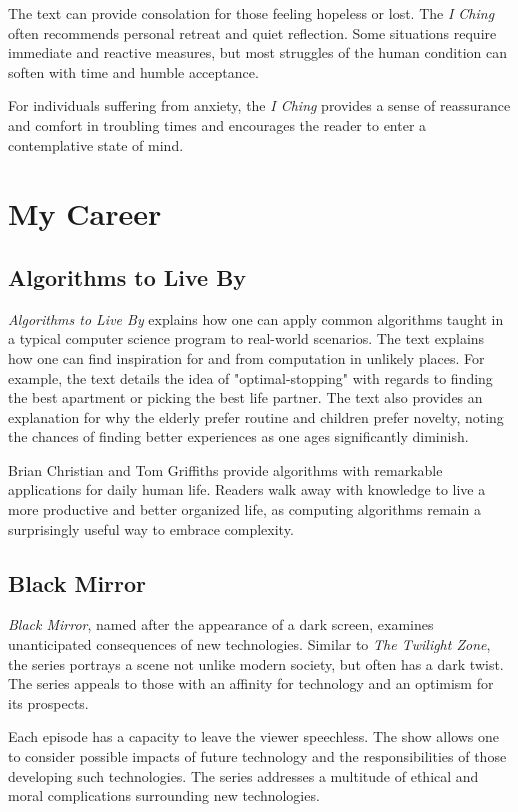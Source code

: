 \documentclass{article}
\begin{document}
The text can provide consolation for those feeling hopeless or lost. The \textit{I Ching} often recommends personal retreat and quiet reflection. Some situations require immediate and reactive measures, but most struggles of the human condition can soften with time and humble acceptance. 

For individuals suffering from anxiety, the \textit{I Ching} provides a sense of reassurance and comfort in troubling times and encourages the reader to enter a contemplative state of mind. 

\section{My Career}

\subsection{Algorithms to Live By}
\textit{Algorithms to Live By} explains how one can apply common algorithms taught in a typical computer science program to real-world scenarios. The text explains how one can find inspiration for and from computation in unlikely places. For example, the text details the idea of "optimal-stopping" with regards to finding the best apartment or picking the best life partner. The text also provides an explanation for why the elderly prefer routine and children prefer novelty, noting the chances of finding better experiences as one ages significantly diminish. 

Brian Christian and Tom Griffiths provide algorithms with remarkable applications for daily human life. Readers walk away with 
knowledge to live a more productive and better organized life, as computing algorithms remain a surprisingly useful way to embrace complexity. 

\subsection{Black Mirror}
\textit{Black Mirror}, named after the appearance of a dark screen, examines unanticipated consequences of new technologies. Similar to \textit{The Twilight Zone}, the series portrays a scene not unlike modern society, but often has a dark twist. The series appeals to those with an affinity for technology and an optimism for its prospects.

Each episode has a capacity to leave the viewer speechless. The show allows one to consider possible impacts of future technology and the responsibilities of those developing such technologies. The series addresses a multitude of ethical and moral complications surrounding new technologies. 
\end{document}
